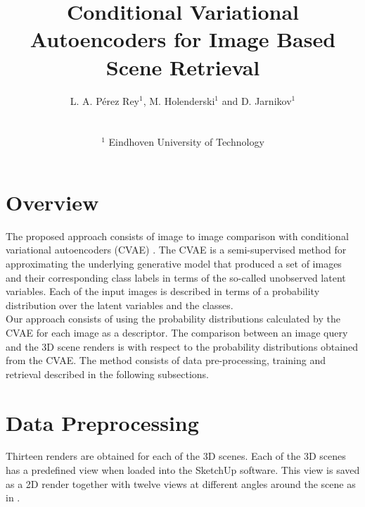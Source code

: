 

\title[]%
      {Conditional Variational Autoencoders for Image Based Scene Retrieval}

\author[L.A. Pérez Rey \& M. Holenderski \& Dmitri Jarnikov]
{\parbox{\textwidth}{\centering L. A. P\'{e}rez Rey$^{1}$, M. Holenderski$^{1}$
        and D. Jarnikov$^{1}$ 
        }
        \\
{\parbox{\textwidth}{\centering $^1$ Eindhoven University of Technology
       }
}
}



\maketitle
\section{Overview}

The proposed approach consists of image to image comparison with conditional variational autoencoders (CVAE) \cite{Kingma2014a}. The CVAE is a semi-supervised method for approximating the underlying generative model that produced a set of images and their corresponding class labels in terms of the so-called unobserved latent variables. Each of the input images is described in terms of a probability distribution over the latent variables and the classes.  \\

Our approach consists of using the probability distributions calculated by the CVAE for each image as a descriptor. The comparison between an image query and the 3D scene renders is with respect to the probability distributions obtained from the CVAE. The method consists of data pre-processing, training and retrieval described in the following subsections.

\section{Data Preprocessing}
Thirteen renders are obtained for each of the 3D scenes. Each of the 3D scenes has a predefined view when loaded into the SketchUp software. This view is saved as a 2D render together with twelve views at different angles around the scene as in \cite{Su2015}.\\

